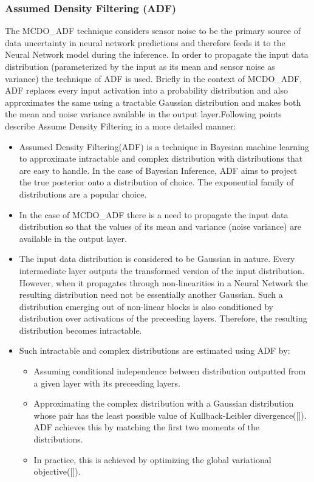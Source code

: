 	\subsubsection{Assumed Density Filtering (ADF)}
	The MCDO\_ADF technique considers sensor noise to be the primary source of data uncertainty in neural network predictions and therefore feeds it to the Neural Network model during the inference. In order to propagate the input data distribution (parameterized by the input as its mean and sensor noise as variance) the technique of ADF is used. Briefly in the context of MCDO\_ADF, ADF replaces every input activation into a probability distribution and also approximates the same using a tractable Gaussian distribution and makes both the mean and noise variance available in the output layer.Following points describe Assume Density Filtering in a more detailed manner:
	\begin{itemize}
		\item Assumed Density Filtering(ADF) is a technique in Bayesian machine learning to approximate intractable and complex distribution with distributions that are easy to handle. In the case of Bayesian Inference, ADF aims to project the true posterior onto a distribution of choice. The exponential family of distributions are a popular choice.
		\item In the case of MCDO\_ADF there is a need to propagate the input data distribution so that the values of its mean and variance (noise variance) are available in the output layer. 
		\item The input data distribution is considered to be Gaussian in nature. Every intermediate layer outputs the transformed version of the input distribution.  However, when it propagates through non-linearities in a Neural Network the resulting distribution need not be essentially another Gaussian. Such a distribution emerging out of non-linear blocks is also conditioned by distribution over activations of the preceeding layers. Therefore, the resulting distribution becomes intractable.
		\item Such intractable and complex distributions are estimated using ADF by:
		\begin{itemize}
			\item Assuming conditional independence between distribution outputted from a given layer with its preceeding layers. 
			\item Approximating the complex distribution with a Gaussian distribution whose pair has the least possible value of Kullback-Leibler divergence([]). ADF achieves this by matching the first two moments of the distributions.
			\item In practice, this is achieved by optimizing the global variational objective([]).
		\end{itemize} 
	\end{itemize}
